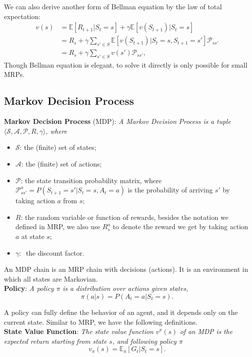 \documentclass{progartcn}
\begin{document}
		We can also derive another form of Bellman equation by the law of total expectation:
		\begin{align*}
		v(s) &=\mathbb{E}[R_{t+1}|S_t=s]+\gamma \mathbb{E}[v(S_{t+1})|S_t=s]\\
		&=R_s+\gamma\sum_{s'\in S}\mathbb{E}[v(S_{t+1})|S_t=s, S_{t+1}=s']\mathcal{P}_{ss'}\tag{by LOTE}\\
		&=R_s + \gamma \sum_{s'\in S} v(s')\mathcal{P}_{ss'},
		\end{align*}
		Though Bellman equation is elegant, to solve it directly is only possible for small MRPs.\\

	\subsection{Markov Decision Process}

		\textbf{Markov Decision Process} (MDP): \textit{A Markov Decision Process is a tuple $\langle \mathcal{S, A, P}, R, \gamma\rangle$, where}
		\begin{itemize}[noitemsep,topsep=0pt]
			\item$\mathcal{S}$: the (finite) set of states;
			\item$\mathcal{A}$: the (finite) set of actions;
			\item$\mathcal{P}$: the state transition probability matrix, where $\mathcal{P}_{ss'}^a=P(S_{t+1}=s'|S_t=s, A_t=a)$ is the probability of arriving $s'$ by taking action $a$ from $s$;
			\item$R$: the random variable or function of rewards, besides the notation we defined in MRP, we also use $R_s^a$ to denote the reward we get by taking action $a$ at state $s$;
			\item$\gamma:\ $ the discount factor.
		\end{itemize}

		An MDP chain is an MRP chain with decisions (actions). It is an environment in which all states are Markovian.\\

		\textbf{Policy}: \textit{A policy $\pi$ is a distribution over actions given states,}
		\[\pi(a|s)=P(A_t=a|S_t=s).\]

		A policy can fully define the behavior of an agent, and it depends only on the current state. Similar to MRP, we have the following definitions.\\

		\textbf{State Value Function}: \textit{The state value function $v^\pi(s)$ of an MDP is the expected return starting from state $s$, and following policy $\pi$}
		\[v_\pi(s)=\mathbb{E}_\pi[G_t|S_t=s].\]\
\end{document}
